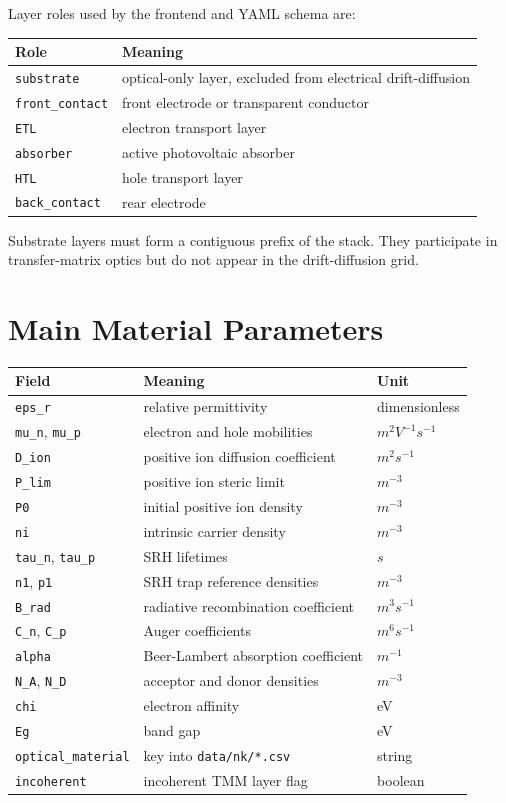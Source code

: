 \documentclass[
  11pt,
  american,
]{report}
\begin{document}
Layer roles used by the frontend and YAML schema are:

\begin{longtable}[]{@{}ll@{}}
\toprule
Role & Meaning \\
\midrule
\endhead
\texttt{substrate} & optical-only layer, excluded from electrical
drift-diffusion \\
\texttt{front\_contact} & front electrode or transparent conductor \\
\texttt{ETL} & electron transport layer \\
\texttt{absorber} & active photovoltaic absorber \\
\texttt{HTL} & hole transport layer \\
\texttt{back\_contact} & rear electrode \\
\bottomrule
\end{longtable}

Substrate layers must form a contiguous prefix of the stack. They
participate in transfer-matrix optics but do not appear in the
drift-diffusion grid.

\hypertarget{main-material-parameters}{%
\section{Main Material Parameters}\label{main-material-parameters}}

\begin{longtable}[]{@{}lll@{}}
\toprule
Field & Meaning & Unit \\
\midrule
\endhead
\texttt{eps\_r} & relative permittivity & dimensionless \\
\texttt{mu\_n}, \texttt{mu\_p} & electron and hole mobilities &
\(m^2 V^{-1} s^{-1}\) \\
\texttt{D\_ion} & positive ion diffusion coefficient & \(m^2 s^{-1}\) \\
\texttt{P\_lim} & positive ion steric limit & \(m^{-3}\) \\
\texttt{P0} & initial positive ion density & \(m^{-3}\) \\
\texttt{ni} & intrinsic carrier density & \(m^{-3}\) \\
\texttt{tau\_n}, \texttt{tau\_p} & SRH lifetimes & \(s\) \\
\texttt{n1}, \texttt{p1} & SRH trap reference densities & \(m^{-3}\) \\
\texttt{B\_rad} & radiative recombination coefficient &
\(m^3 s^{-1}\) \\
\texttt{C\_n}, \texttt{C\_p} & Auger coefficients & \(m^6 s^{-1}\) \\
\texttt{alpha} & Beer-Lambert absorption coefficient & \(m^{-1}\) \\
\texttt{N\_A}, \texttt{N\_D} & acceptor and donor densities &
\(m^{-3}\) \\
\texttt{chi} & electron affinity & eV \\
\texttt{Eg} & band gap & eV \\
\texttt{optical\_material} & key into \texttt{data/nk/*.csv} & string \\
\texttt{incoherent} & incoherent TMM layer flag & boolean \\
\bottomrule
\end{longtable}
\end{document}
